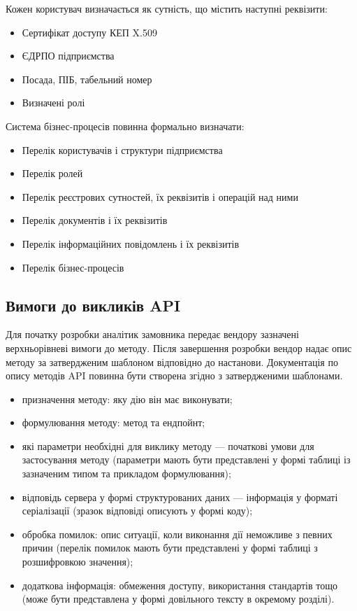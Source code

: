 \documentclass{article}
\begin{document}
Кожен користувач визначається як сутність, що містить наступні реквізити:
\begin{itemize}
    \item Сертифікат доступу КЕП X.509
    \item ЄДРПО підприємства
    \item Посада, ПІБ, табельний номер
    \item Визначені ролі
\end{itemize}

Система бізнес-процесів повинна формально визначати:
\begin{itemize}
    \item Перелік користувачів і структури підприємства
    \item Перелік ролей
    \item Перелік реєстрових сутностей, їх реквізитів і операцій над ними
    \item Перелік документів і їх реквізитів
    \item Перелік інформаційних повідомлень і їх реквізитів
    \item Перелік бізнес-процесів
\end{itemize}

\newpage
\subsection{Вимоги до викликів API}
Для початку розробки аналітик замовника передає вендору зазначені верхньорівневі вимоги до методу.
Після завершення розробки вендор надає опис методу за затвердженим шаблоном відповідно до настанови.
Документація по опису методів API повинна бути створена згідно з затвердженими шаблонами.

\begin{itemize}
    \item призначення методу: яку дію він має виконувати;
    \item формулювання методу: метод та ендпойнт;
    \item які параметри необхідні для виклику методу — початкові умови для застосування методу (параметри мають бути представлені у формі таблиці із зазначеним типом та прикладом формулювання);
    \item відповідь сервера у формі структурованих даних — інформація у форматі серіалізації (зразок відповіді описують у формі коду);
    \item обробка помилок: опис ситуації, коли виконання дії неможливе з певних причин (перелік помилок мають бути представлені у формі таблиці з розшифровкою значення);
    \item додаткова інформація: обмеження доступу, використання стандартів тощо (може бути представлена у формі довільного тексту в окремому розділі).
\end{itemize}
\end{document}
